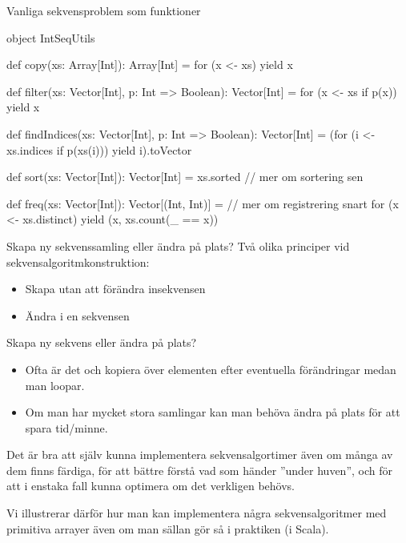 \begin{Slide}{Vanliga sekvensproblem som funktioner}
\begin{Code}
object IntSeqUtils {
  def copy(xs: Array[Int]): Array[Int] = for (x <- xs) yield x

  def filter(xs: Vector[Int], p: Int => Boolean): Vector[Int] =
    for (x <- xs if p(x)) yield x

  def findIndices(xs: Vector[Int], p: Int => Boolean): Vector[Int] =
    (for (i <- xs.indices if p(xs(i))) yield i).toVector

  def sort(xs: Vector[Int]): Vector[Int] = xs.sorted // mer om sortering sen

  def freq(xs: Vector[Int]): Vector[(Int, Int)] = // mer om registrering snart
    for (x <- xs.distinct) yield (x, xs.count(_ == x))
}
\end{Code}
\end{Slide}



%
%
%
%


\begin{Slide}{Skapa ny sekvenssamling eller ändra på plats?}
  Två olika principer vid sekvensalgoritmkonstruktion:
  \begin{itemize}
  \item Skapa  utan att förändra insekvensen
  \item Ändra   i en  sekvensen
  \end{itemize}

Skapa ny sekvens eller ändra på plats?
\begin{itemize}
\item Ofta är det  och kopiera över elementen efter eventuella förändringar medan man loopar.
\item Om man har mycket stora samlingar kan man behöva ändra på plats för att spara tid/minne.
\end{itemize}
Det är bra att själv kunna implementera sekvensalgortimer även om många av dem finns färdiga, för att bättre förstå vad som händer ''under huven'', och för att i enstaka fall kunna optimera om det verkligen behövs.

Vi illustrerar därför hur man kan implementera några sekvensalgoritmer med primitiva arrayer även om man sällan gör så i praktiken (i Scala).
\end{Slide}
